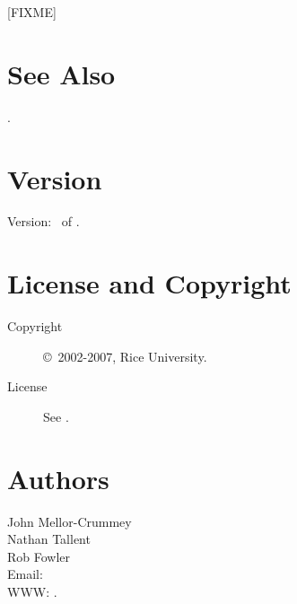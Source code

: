 \documentclass[english]{article}
\begin{document}
[FIXME]




\section{See Also}

.

\section{Version}

Version: \Version\ of \Date.

\section{License and Copyright}

\begin{description}
\item[Copyright] \copyright\ 2002-2007, Rice University.
\item[License] See .
\end{description}

\section{Authors}

\noindent
John Mellor-Crummey \\
Nathan Tallent \\
Rob Fowler \\
Email:  \\
WWW: .

\LatexManEnd
\end{document}
